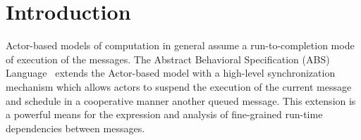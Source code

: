 \section{Introduction}




Actor-based models of computation in general assume a run-to-completion mode
of execution of the messages.
The Abstract Behavioral Specification (ABS) Language~\cite{abs} extends the Actor-based model
with a high-level synchronization mechanism which allows actors to suspend the
execution of the current message and schedule in a cooperative manner another
queued message. This extension is a powerful means for the expression and analysis
of fine-grained run-time dependencies between messages.




